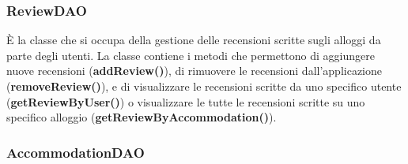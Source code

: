 \documentclass[10pt]{article}
\begin{document}
\subsubsection{ReviewDAO}

\`E la classe che si occupa della gestione delle recensioni scritte sugli alloggi da parte degli utenti. La classe contiene i metodi che permettono di aggiungere nuove recensioni (\textbf{addReview()}), di rimuovere le recensioni dall'applicazione (\textbf{removeReview()}), e di visualizzare le recensioni scritte da uno specifico utente (\textbf{getReviewByUser()}) o visualizzare le tutte le recensioni scritte su uno specifico alloggio (\textbf{getReviewByAccommodation()}). 

\subsubsection{AccommodationDAO}
\end{document}
